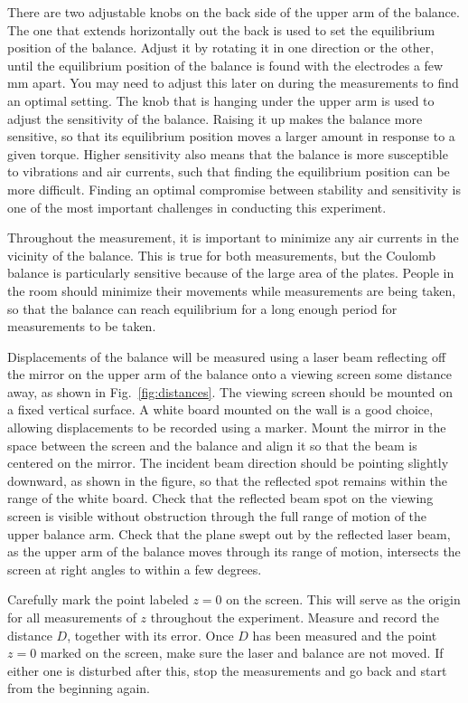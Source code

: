 \documentclass{revtex4}
\begin{document}
There are two adjustable knobs on the back side of the upper arm of the
balance.  The one that extends horizontally out the back is used to set
the equilibrium position of the balance.  Adjust it by rotating it in one
direction or the other, until the equilibrium position of the balance is
found with the electrodes a few mm apart.  You may need to adjust this
later on during the measurements to find an optimal setting.  The knob
that is hanging under the upper arm is used to adjust the sensitivity
of the balance.  Raising it up makes the balance more sensitive, so that
its equilibrium position moves a larger amount in response to a given
torque.  Higher sensitivity also means that the balance is more susceptible
to vibrations and air currents, such that finding the equilibrium position
can be more difficult.  Finding an optimal compromise between stability
and sensitivity is one of the most important challenges in conducting
this experiment.

Throughout the measurement, it is important to minimize
any air currents in the vicinity of the balance.  This is true for both
measurements, but the Coulomb balance is particularly sensitive because
of the large area of the plates.  People in the room should minimize their
movements while measurements are being taken, so that the balance can
reach equilibrium for a long enough period for measurements to be taken.

Displacements of the balance will be measured using a laser beam reflecting
off the mirror on the upper arm of the balance onto a viewing screen some
distance away, as shown in Fig.~\ref{fig:distances}.
The viewing screen should be mounted on a fixed vertical
surface.  A white board mounted on the wall is a good choice, allowing
displacements to be recorded using a marker.  Mount the mirror in the space
between the screen and the balance and align it so that the beam is
centered on the mirror.  The incident beam direction should be pointing
slightly downward, as shown in the figure, so that the reflected spot
remains within the range of the white board.  Check that the reflected
beam spot on the viewing screen is visible without obstruction through
the full range of motion of the upper balance arm.  Check that the plane
swept out by the reflected laser beam, as the upper arm of the balance
moves through its range of motion, intersects the screen at right angles
to within a few degrees.

Carefully mark the point labeled $z=0$ on the screen.  This will serve as
the origin for all measurements of $z$ throughout the experiment.  Measure
and record the distance $D$, together with its error.  Once $D$ has been
measured and the point $z=0$ marked on the screen, make sure the laser and
balance are not moved.  If either one is disturbed after this, stop the
measurements and go back and start from the beginning again.
\end{document}

